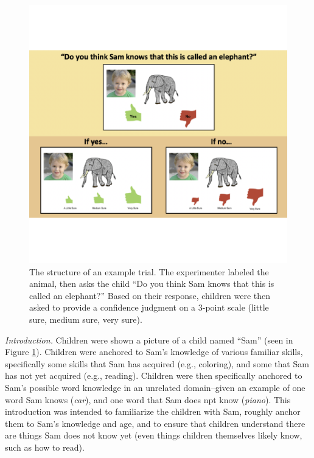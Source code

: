 \documentclass[10pt, letterpaper]{article}
\newenvironment{CodeChunk}{}{}
\begin{document}
\begin{CodeChunk}
\begin{figure}[tb]

{\centering \includegraphics{figs/task-method-1} 

}

\caption[The structure of an example trial]{The structure of an example trial. The experimenter labeled the animal, then asks the child “Do you think Sam knows that this is called an elephant?” Based on their response, children were then asked to provide a confidence judgment on a 3-point scale (little sure, medium sure, very sure).}\label{fig:task-method}
\end{figure}
\end{CodeChunk}

\emph{Introduction.} Children were shown a picture of a child named
``Sam'' (seen in Figure \ref{fig:task-method}). Children were anchored
to Sam's knowledge of various familiar skills, specifically some skills
that Sam has acquired (e.g., coloring), and some that Sam has not yet
acquired (e.g., reading). Children were then specifically anchored to
Sam's possible word knowledge in an unrelated domain--given an example
of one word Sam knows (\emph{car}), and one word that Sam does npt know
(\emph{piano}). This introduction was intended to familiarize the
children with Sam, roughly anchor them to Sam's knowledge and age, and
to ensure that children understand there are things Sam does not know
yet (even things children themselves likely know, such as how to read).
\end{document}
